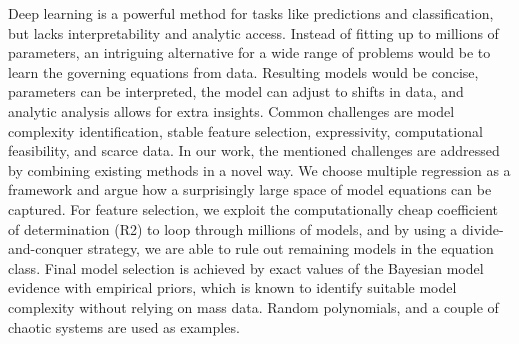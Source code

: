 Deep learning is a powerful method for tasks like predictions and classification, but lacks interpretability and analytic access. Instead of fitting up to millions of parameters, an intriguing alternative for a wide range of problems would be to learn the governing equations from data. Resulting models would be concise, parameters can be interpreted, the model can adjust to shifts in data, and analytic analysis allows for extra insights. Common challenges are model complexity identification, stable feature selection, expressivity, computational feasibility, and scarce data. In our work, the mentioned challenges are addressed by combining existing methods in a novel way. We choose multiple regression as a framework and argue how a surprisingly large space of model equations can be captured. For feature selection, we exploit the computationally cheap coefficient of determination (R2) to loop through millions of models, and by using a divide-and-conquer strategy, we are able to rule out remaining models in the equation class. Final model selection is achieved by exact values of the Bayesian model evidence with empirical priors, which is known to identify suitable model complexity without relying on mass data. Random polynomials, and a couple of chaotic systems are used as examples.
